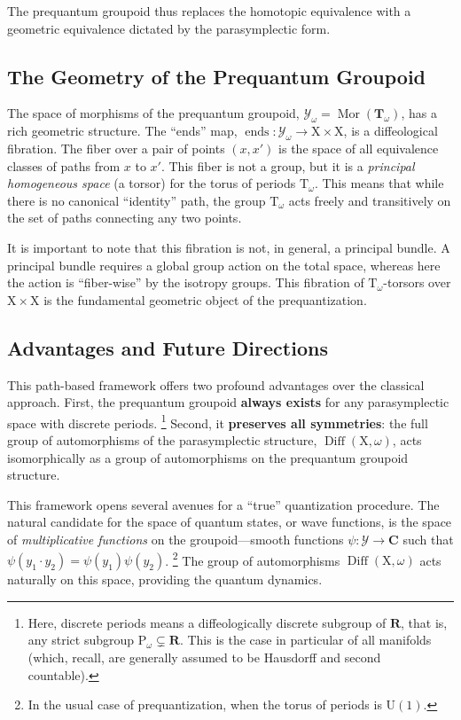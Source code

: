\documentclass[10pt,reqno,letterpaper,twoside]{amsart}
\theoremstyle{article}
\newcommand{\RR}{\mathbf{R}}
\newcommand{\CC}{\mathbf{C}}
\newcommand{\TT}{\mathbf{T}}
\newcommand{\cY}{{\mathcal Y}}
\def \P{\mathrm P}
\def \T{\mathrm T}
\def \U{\mathrm U}
\def \X{\mathrm X}
\DeclareMathOperator{\Diff}{Diff}
\newcommand{\pathends}{\operatorname{ends}}
\newcommand{\Mor}{\operatorname{Mor}}
\begin{document}
  The prequantum groupoid thus replaces the homotopic equivalence with a geometric equivalence dictated by the parasymplectic form.
  
  \subsection{The Geometry of the Prequantum Groupoid}
  
  The space of morphisms of the prequantum groupoid, $\cY_\omega = \Mor(\TT_\omega)$,
  has a rich geometric structure.
  The ``ends'' map, $\pathends: \cY_\omega \to \X \times \X$,
  is a diffeological fibration.
  The fiber over a pair of points $(x,x')$ is the space of all equivalence classes of paths from $x$ to $x'$.
  This fiber is not a group,
  but it is a \emph{principal homogeneous space} (a torsor) for the torus of periods $\T_\omega$.
  This means that while there is no canonical ``identity'' path,
  the group $\T_\omega$ acts freely and transitively on the set of paths connecting any two points.
  
  It is important to note that this fibration is not,
  in general,
  a principal bundle.
  A principal bundle requires a global group action on the total space,
  whereas here the action is ``fiber-wise'' by the isotropy groups.
  This fibration of $\T_\omega$-torsors over $\X \times \X$ is the fundamental geometric object of the prequantization.
  
  \subsection{Advantages and Future Directions}
  
  This path-based framework offers two profound advantages over the classical approach.
  First,
  the prequantum groupoid \textbf{always exists} for any parasymplectic space with discrete periods.%
  \footnote{Here,
  discrete periods means a diffeologically discrete subgroup of $\RR$,
  that is,
  any strict subgroup $\P_\omega \subsetneq \RR$.
  This is the case in particular of all manifolds (which, recall, are generally assumed to be Hausdorff and second countable).}
  Second,
  it \textbf{preserves all symmetries}:
  the full group of automorphisms of the parasymplectic structure,
  $\Diff(\X, \omega)$,
  acts isomorphically as a group of automorphisms on the prequantum groupoid structure.
  
  This framework opens several avenues for a ``true'' quantization procedure.
  The natural candidate for the space of quantum states,
  or wave functions,
  is the space of \emph{multiplicative functions} on the groupoid—smooth functions $\psi: \cY \to \CC$ such that $\psi(y_1 \cdot y_2) = \psi(y_1)\psi(y_2)$.%
  \footnote{In the usual case of prequantization,
  when the torus of periods is $\U(1)$.}
  The group of automorphisms $\Diff(\X, \omega)$ acts naturally on this space,
  providing the quantum dynamics.
  
\end{document}
